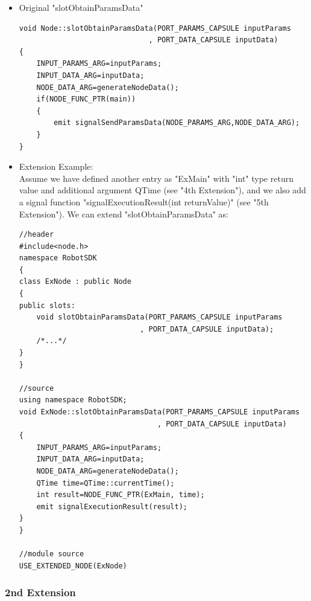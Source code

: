 \documentclass[a4paper,10pt]{book}
\begin{document}
\begin{mdframed}
\begin{itemize}
 \item Original "slotObtainParamsData"
 \begin{verbatim}
void Node::slotObtainParamsData(PORT_PARAMS_CAPSULE inputParams
                              , PORT_DATA_CAPSULE inputData)
{
    INPUT_PARAMS_ARG=inputParams;
    INPUT_DATA_ARG=inputData;
    NODE_DATA_ARG=generateNodeData();
    if(NODE_FUNC_PTR(main))
    {
        emit signalSendParamsData(NODE_PARAMS_ARG,NODE_DATA_ARG);
    }
}
 \end{verbatim}
\item Extension Example:\\
Assume we have defined another entry as "ExMain" with "int" type return value and additional argument QTime (see "4th Extension"), and we also add a signal function "signalExecutionResult(int returnValue)" (see "5th Extension"). We can extend "slotObtainParamsData" as:
\begin{verbatim}
//header
#include<node.h>
namespace RobotSDK
{
class ExNode : public Node
{
public slots:
    void slotObtainParamsData(PORT_PARAMS_CAPSULE inputParams
                            , PORT_DATA_CAPSULE inputData);
    /*...*/
}
}

//source
using namespace RobotSDK;
void ExNode::slotObtainParamsData(PORT_PARAMS_CAPSULE inputParams
                                , PORT_DATA_CAPSULE inputData)
{
    INPUT_PARAMS_ARG=inputParams;
    INPUT_DATA_ARG=inputData;
    NODE_DATA_ARG=generateNodeData();
    QTime time=QTime::currentTime();
    int result=NODE_FUNC_PTR(ExMain, time);
    emit signalExecutionResult(result);
}
}

//module source
USE_EXTENDED_NODE(ExNode)
\end{verbatim}
\end{itemize}
\end{mdframed}

\subsubsection{2nd Extension}
\end{document}
